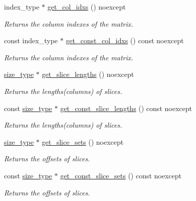 \begin{DoxyCompactItemize}
index\+\_\+type $\ast$ \hyperlink{classgko_1_1matrix_1_1Sellp_abb770ef6fed094f707c96219a8b69d11}{get\+\_\+col\+\_\+idxs} () noexcept
\begin{DoxyCompactList}\small\item\em Returns the column indexes of the matrix. \end{DoxyCompactList}\item 
const index\+\_\+type $\ast$ \hyperlink{classgko_1_1matrix_1_1Sellp_a6b5417bd6f2c876925ce732c7526b562}{get\+\_\+const\+\_\+col\+\_\+idxs} () const noexcept
\begin{DoxyCompactList}\small\item\em Returns the column indexes of the matrix. \end{DoxyCompactList}\item 
\hyperlink{namespacegko_a6e5c95df0ae4e47aab2f604a22d98ee7}{size\+\_\+type} $\ast$ \hyperlink{classgko_1_1matrix_1_1Sellp_ab22f4de41d95db19e96433dc4583f512}{get\+\_\+slice\+\_\+lengths} () noexcept
\begin{DoxyCompactList}\small\item\em Returns the lengths(columns) of slices. \end{DoxyCompactList}\item 
const \hyperlink{namespacegko_a6e5c95df0ae4e47aab2f604a22d98ee7}{size\+\_\+type} $\ast$ \hyperlink{classgko_1_1matrix_1_1Sellp_adf13bb4a4f8660b4ae27fe2ae6a874aa}{get\+\_\+const\+\_\+slice\+\_\+lengths} () const noexcept
\begin{DoxyCompactList}\small\item\em Returns the lengths(columns) of slices. \end{DoxyCompactList}\item 
\hyperlink{namespacegko_a6e5c95df0ae4e47aab2f604a22d98ee7}{size\+\_\+type} $\ast$ \hyperlink{classgko_1_1matrix_1_1Sellp_afecef07cef594f1d23c735e66ee90ec6}{get\+\_\+slice\+\_\+sets} () noexcept
\begin{DoxyCompactList}\small\item\em Returns the offsets of slices. \end{DoxyCompactList}\item 
const \hyperlink{namespacegko_a6e5c95df0ae4e47aab2f604a22d98ee7}{size\+\_\+type} $\ast$ \hyperlink{classgko_1_1matrix_1_1Sellp_a1b5bcac41afe4dee75994ad05c1ffc81}{get\+\_\+const\+\_\+slice\+\_\+sets} () const noexcept
\begin{DoxyCompactList}\small\item\em Returns the offsets of slices. \end{DoxyCompactList}\item 

\end{DoxyCompactItemize}
